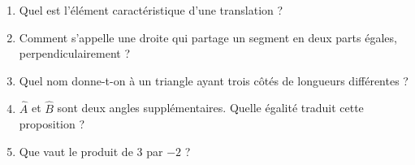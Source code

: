 \documentclass[parskip=half-,DIV=12,twoside=semi, 12pt]{scrartcl}
\newcommand{\abs}[1]{\mid#1\mid}
\newcounter{l}
\begin{document}
\begin{connaitre}[points=11]
\begin{enumerate}
        \item Quel est l'élément caractéristique d'une translation ?
        \item Comment s'appelle une droite qui partage un segment en deux parts égales, perpendiculairement ?
        \item Quel nom donne-t-on à un triangle ayant trois côtés de longueurs différentes ?
        \item \(\widehat{A}\) et \(\widehat{B}\) sont deux angles supplémentaires. Quelle égalité traduit cette proposition ?
        \item Que vaut le produit de 3 par \(-2\) ?
    \end{enumerate}
\end{connaitre}
\end{document}

